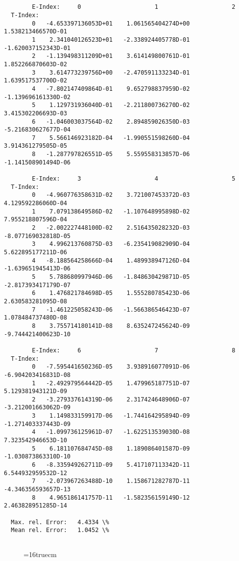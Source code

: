 \documentclass[12pt,dvipdfmx]{article}
\begin{document}
\begin{small}\begin{verbatim}


        E-Index:     0                     1                     2
  T-Index:
        0   -4.653397136053D+01    1.061565404274D+00    1.538213466570D-01
        1    2.341040126523D+01   -2.338924405778D-01   -1.620037152343D-01
        2   -1.139498311209D+01    3.614149800761D-01    1.852266870603D-02
        3    3.614773239756D+00   -2.470591133234D-01    1.639517537700D-02
        4   -7.802147409864D-01    9.652798837959D-02   -1.139696161330D-02
        5    1.129731936040D-01   -2.211800736270D-02    3.415302206693D-03
        6   -1.046003037564D-02    2.894859026350D-03   -5.216830627677D-04
        7    5.566146923182D-04   -1.990551598260D-04    3.914361279505D-05
        8   -1.287797826551D-05    5.559558313857D-06   -1.141508901494D-06

        E-Index:     3                     4                     5
  T-Index:
        0   -4.960776358631D-02    3.721007453372D-03    4.129592286060D-04
        1    7.079138649586D-02   -1.107648995898D-02    7.955218807596D-04
        2   -2.002227448100D-02    2.516435028232D-03   -8.077169032818D-05
        3    4.996213760875D-03   -6.235419082909D-04    5.622895177211D-06
        4   -8.188564258666D-04    1.489938947126D-04   -1.639651945413D-06
        5    5.788680997946D-06   -1.848630429871D-05   -2.817393417179D-07
        6    1.476821784698D-05    1.555280785423D-06    2.630583281095D-08
        7   -1.461225058243D-06   -1.566386546423D-07    1.078484737480D-08
        8    3.755714180141D-08    8.635247245624D-09   -9.744421400623D-10

        E-Index:     6                     7                     8
  T-Index:
        0   -7.595441650236D-05    3.938916077091D-06   -6.904203416831D-08
        1   -2.492979564442D-05    1.479965187751D-07    5.129381943121D-09
        2   -3.279337614319D-06    2.317424648906D-07   -3.212001663062D-09
        3    1.149833159917D-06   -1.744164295894D-09   -1.271403337443D-09
        4   -1.099736125961D-07   -1.622513539030D-08    7.323542946653D-10
        5    6.181107684745D-08    1.189086401587D-09   -1.030873863310D-10
        6   -8.335949262711D-09    5.417107113342D-11    6.544932959532D-12
        7   -2.073967263488D-10    1.158671282787D-11   -4.346356593657D-13
        8    4.965186141757D-11   -1.582356159149D-12    2.463828951285D-14

  Max. rel. Error:   4.4334 \%
  Mean rel. Error:   1.0452 \%


\end{verbatim}\end{small}
\begin{figure} \label{2.2c}
\epsfxsize=16truecm
\end{figure}
\newpage
\end{document}

